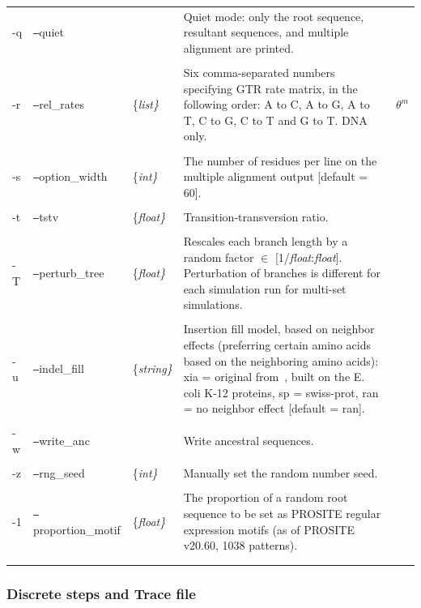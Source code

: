 \documentclass[10pt]{article}
\begin{document}
\begin{ThreePartTable}
\begin{longtable}{p{0.40in}llp{2.75in}p{0.25in}}
\\
 -q & {\tt --}quiet & & Quiet mode: only the root sequence, resultant sequences, and multiple alignment are printed.\\
\\
 -r & {\tt --}rel\_rates & \{\it list\} & Six comma-separated numbers specifying GTR rate matrix, in the following order: A to C, A to G, A to T, C to G, C to T and G to T. DNA only. & $\theta^m$ \tnote{b}\\
\\
 -s & {\tt --}option\_width & \{\it int\} & The number of residues per line on the multiple alignment output [default = 60]. \\
\\
 -t & {\tt --}tstv & \{\it float\} & Transition-transversion ratio. \\
\\
 -T & {\tt --}perturb\_tree & \{\it float\} & Rescales each branch length by a random factor $\in$ [1/{\it float}:{\it float}]. Perturbation of branches is different for each simulation run for multi-set simulations. \\
\\
 -u & {\tt --}indel\_fill & \{\it string\} & Insertion fill model, based on neighbor effects (preferring certain amino acids based on the neighboring amino acids): xia = original from~\cite{Xia02}, built on the E. coli K-12 proteins, sp = swiss-prot, ran = no neighbor effect [default = ran]. \\
\\
 -w & {\tt --}write\_anc & & Write ancestral sequences. \\
\\
 -z & {\tt --}rng\_seed & \{\it int\} & Manually set the random number seed.\\
\\
 -1 & {\tt --}proportion\_motif & \{\it float\} & The proportion of a random root sequence to be set as PROSITE regular expression motifs (as of PROSITE v20.60, 1038 patterns).\\
 \\
 \hline
 \label{tab:global}
 \end{longtable}
\end{ThreePartTable}

\newpage

 \subsubsection{Discrete steps and Trace file}
 \label{sec:trace}
 
\end{document}

